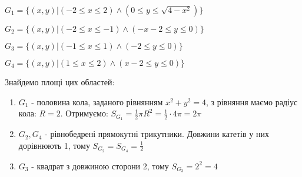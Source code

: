 \documentclass[a4paper, 20pt, titlepage]{article}
\begin{document}
\begin{spacing}{1.4}

$G_1 =  \Big\{ (x,y) \big| (-2\leqslant x \leqslant 2) \wedge (0 \leqslant y \leqslant \sqrt{4-x^2}) \Big\}$

\vspace{2mm}
$G_2 =  \Big\{ (x,y) \big| (-2\leqslant x \leqslant -1) \wedge (-x-2 \leqslant y \leqslant 0) \Big\}$

\vspace{2mm}
$G_3 =  \Big\{ (x,y) \big| (-1 \leqslant x \leqslant 1) \wedge (-2 \leqslant y \leqslant 0) \Big\}$

\vspace{2mm}
$G_4 =  \Big\{ (x,y) \big| (1 \leqslant x \leqslant 2) \wedge (x-2 \leqslant y \leqslant 0) \Big\}$

\vspace{5mm}
Знайдемо площі цих областей:
\begin{enumerate}
\item $G_1$ - половина кола, заданого рівнянням $x^2+y^2 = 4$, з рівняння маємо радіус кола: $R = 2$. Отримуємо:
$S_{G_1} = \frac{1}{2} \pi R^2 = \frac{1}{2} \cdot 4 \pi = 2\pi$ 

\item $G_2, G_4$ - рівнобедрені прямокутні трикутники. Довжини катетів у них дорівнюють 1, тому $S_{G_2} = S_{G_4} = \frac{1}{2}$

\item $G_3$ - квадрат з довжиною сторони 2, тому $S_{G_3} = 2^2 = 4$ 
\end{enumerate}
\end{spacing}

\newpage{}
\end{document}
